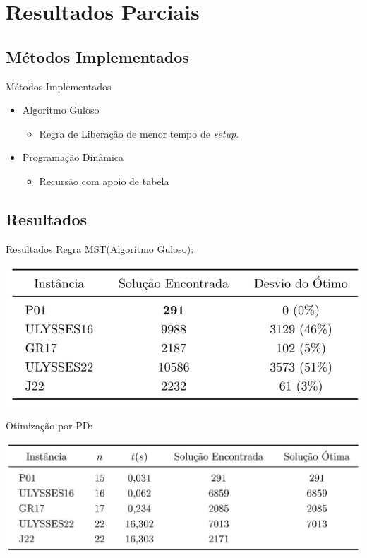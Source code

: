 \documentclass{beamer}
\begin{document}
\section{Resultados Parciais}
\begin{frame}
\tableofcontents[ 
    currentsubsection, 
    hideothersubsections, 
    sectionstyle=show/shaded
    ] 
\end{frame}
\subsection{Métodos Implementados}
\begin{frame}{Métodos Implementados}
\Large
\begin{itemize}
\item Algoritmo Guloso
\begin{itemize}
\large
\item Regra de Liberação de menor tempo de \textit{setup}.\cite{pacheco2001adoccao} 
\end{itemize}
\bigskip
\item Programação Dinâmica
\begin{itemize}
\large
\item Recursão com apoio de tabela 
\end{itemize}
\end{itemize}

\end{frame}
\subsection{Resultados}
\begin{frame}{Resultados}
Regra MST(Algoritmo Guloso):
\begin{table}[h]
\includegraphics[scale=0.6]{Tabela1}
\end{table}
Otimização por PD:
\begin{table}[h]
\includegraphics[scale=0.5]{Tabela2}
\end{table}
\end{frame}
\end{document}
